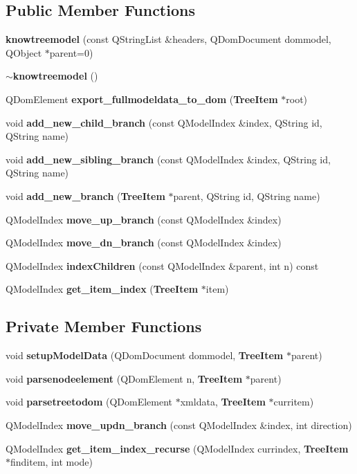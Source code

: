\subsection*{Public Member Functions}
\begin{CompactItemize}
\item 
{\bf knowtreemodel} (const QString\-List \&headers, QDom\-Document dommodel, QObject $\ast$parent=0)
\item 
{\bf $\sim$knowtreemodel} ()
\item 
QDom\-Element {\bf export\_\-fullmodeldata\_\-to\_\-dom} ({\bf Tree\-Item} $\ast$root)
\item 
void {\bf add\_\-new\_\-child\_\-branch} (const QModel\-Index \&index, QString id, QString name)
\item 
void {\bf add\_\-new\_\-sibling\_\-branch} (const QModel\-Index \&index, QString id, QString name)
\item 
void {\bf add\_\-new\_\-branch} ({\bf Tree\-Item} $\ast$parent, QString id, QString name)
\item 
QModel\-Index {\bf move\_\-up\_\-branch} (const QModel\-Index \&index)
\item 
QModel\-Index {\bf move\_\-dn\_\-branch} (const QModel\-Index \&index)
\item 
QModel\-Index {\bf index\-Children} (const QModel\-Index \&parent, int n) const
\item 
QModel\-Index {\bf get\_\-item\_\-index} ({\bf Tree\-Item} $\ast$item)
\end{CompactItemize}
\subsection*{Private Member Functions}
\begin{CompactItemize}
\item 
void {\bf setup\-Model\-Data} (QDom\-Document dommodel, {\bf Tree\-Item} $\ast$parent)
\item 
void {\bf parsenodeelement} (QDom\-Element n, {\bf Tree\-Item} $\ast$parent)
\item 
void {\bf parsetreetodom} (QDom\-Element $\ast$xmldata, {\bf Tree\-Item} $\ast$curritem)
\item 
QModel\-Index {\bf move\_\-updn\_\-branch} (const QModel\-Index \&index, int direction)
\item 
QModel\-Index {\bf get\_\-item\_\-index\_\-recurse} (QModel\-Index currindex, {\bf Tree\-Item} $\ast$finditem, int mode)
\end{CompactItemize}


